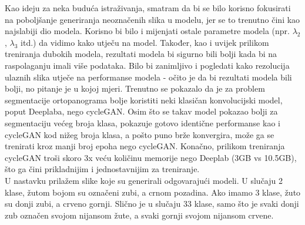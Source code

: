 \noindent Kao ideju za neka buduća istraživanja, smatram da bi se bilo korisno fokusirati na poboljšanje generiranja neoznačenih slika u modelu, jer se to trenutno čini kao najslabiji dio modela. Korisno bi bilo i mijenjati ostale parametre modela (npr. $\lambda_{2}$, $\lambda_{3}$ itd.) da vidimo kako utječu na model. Također, kao i uvijek prilikom treniranja dubokih modela, rezultati modela bi sigurno bili bolji kada bi na raspolaganju imali više podataka. Bilo bi zanimljivo i pogledati kako rezolucija ulaznih slika utječe na performanse modela - očito je da bi rezultati modela bili bolji, no pitanje je u kojoj mjeri. Trenutno se pokazalo da je za problem segmentacije ortopanograma bolje koristiti neki klasičan konvolucijski model, poput Deeplaba, nego cycleGAN. Osim što se takav model pokazao bolji za segmentaciju većeg broja klasa, pokazuje gotovo identične performanse kao i cycleGAN kod nižeg broja klasa, a pošto puno brže konvergira, može ga se trenirati kroz manji broj epoha nego cycleGAN. Konačno, prilikom treniranja cycleGAN troši skoro 3x veću količinu memorije nego Deeplab (3GB vs 10.5GB), što ga čini prikladnijim i jednostavnijim za treniranje.\\


\noindent U nastavku prilažem slike koje su generirali odgovarajući modeli. U slučaju 2 klase, žutom bojom su označeni zubi, a crnom pozadina. Ako imamo 3 klase, žuto su donji zubi, a crveno gornji. Slično je u slučaju 33 klase, samo što je svaki donji zub označen svojom nijansom žute, a svaki gornji svojom nijansom crvene. \\


